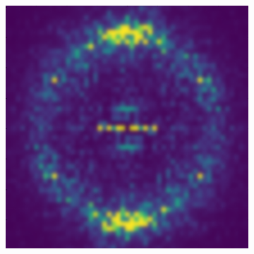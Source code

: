 \documentclass{article}
\begin{document}
\begin{figure}
\begin{subfigure}[t]{.3\textwidth}
\caption{}\label{fig:experimental_XRD}
\end{subfigure}
%
\begin{subfigure}[t]{.3\textwidth}
\centering
\vspace{0pt}%
\includegraphics[width=\linewidth]{WAXS_ordered_pore_qyqz.png}
\caption{}\label{fig:Ordered_XRD_sim}
\end{subfigure}

\end{figure}
\end{document}
